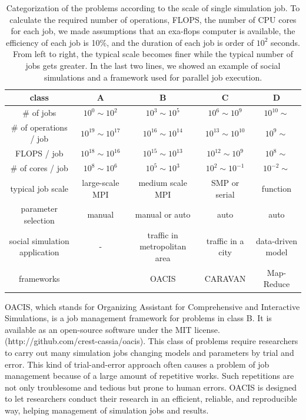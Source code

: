 \begin{table}[htb]
  \caption{Categorization of the problems according to the scale of single simulation job.
  To calculate the required number of operations, FLOPS, the number of CPU cores for each job, we made assumptions that an exa-flops computer is available, the efficiency of each job is 10\%, and the duration of each job is order of $10^2$ seconds.
  From left to right, the typical scale becomes finer while the typical number of jobs gets greater.
  In the last two lines, we showed an example of social simulations and a framework used for parallel job execution.
  }
  \label{tab:problem_scale}
  \centering
  \begin{tabular}{|c|cccc|} \hline
    class      & A                & B                & C                & D \\ \hline
    \# of jobs & $10^0 \sim 10^2$ & $10^3 \sim 10^5$ & $10^6 \sim 10^9$ & $10^{10} \sim$ \\
    \# of operations / job & $10^{19} \sim 10^{17}$ & $10^{16} \sim 10^{14}$ & $10^{13} \sim 10^{10}$ & $10^{9} \sim$ \\
    FLOPS / job & $10^{18} \sim 10^{16}$ & $10^{15} \sim 10^{13}$ & $10^{12} \sim 10^{9}$ & $10^{8} \sim$ \\
    \# of cores / job & $10^{8} \sim 10^{6}$ & $10^{5} \sim 10^{3}$ & $10^{2} \sim 10^{-1}$ & $10^{-2} \sim$ \\
    typical job scale & large-scale MPI & medium scale MPI & SMP or serial & function \\
    parameter selection & manual & manual or auto & auto & auto \\
    social simulation application & - & traffic in metropolitan area & traffic in a city & data-driven model \\
    frameworks & & OACIS & CARAVAN & Map-Reduce \\
    \hline
  \end{tabular}
\end{table}

OACIS, which stands for Organizing Assistant for Comprehensive and Interactive Simulations, is a job management framework for problems in class B\cite{murase2014tool}.
It is available as an open-source software under the MIT license. (http://github.com/crest-cassia/oacis).
This class of problems require researchers to carry out many simulation jobs changing models and parameters by trial and error.
This kind of trial-and-error approach often causes a problem of job management because of a large amount of repetitive works.
Such repetitions are not only troublesome and tedious but prone to human errors.
OACIS is designed to let researchers conduct their research in an efficient, reliable, and reproducible way, helping management of simulation jobs and results.

